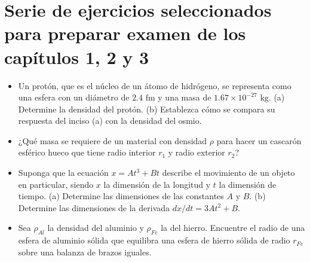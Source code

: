 \documentclass[11pt,a4paper]{article}
\begin{document}
\section*{Serie de ejercicios seleccionados para preparar examen de los capítulos 1, 2 y 3}

\begin{itemize}
    \item[\textbf{1.}] Un protón, que es el núcleo de un átomo de hidrógeno, se representa como una esfera con un diámetro de $2.4 \text{ fm}$ y una masa de $1.67 \times 10^{-27} \text{ kg}$. (a) Determine la densidad del protón. (b) Establezca cómo se compara su respuesta del inciso (a) con la densidad del osmio.
    \vspace*{6cm}

    \item[\textbf{2.}] ¿Qué masa se requiere de un material con densidad $\rho$ para hacer un cascarón esférico hueco que tiene radio interior $r_1$ y radio exterior $r_2$?
    \vspace*{5cm}

    \item[\textbf{3.}] Suponga que la ecuación $x = At^3 + Bt$ describe el movimiento de un objeto en particular, siendo $x$ la dimensión de la longitud y $t$ la dimensión de tiempo. (a) Determine las dimensiones de las constantes $A$ y $B$. (b) Determine las dimensiones de la derivada $dx/dt = 3At^2 + B$.
    \vspace*{6cm}

    \item[\textbf{4.}] Sea $\rho_{Al}$ la densidad del aluminio y $\rho_{Fe}$ la del hierro. Encuentre el radio de una esfera de aluminio sólida que equilibra una esfera de hierro sólida de radio $r_{Fe}$ sobre una balanza de brazos iguales.
    \vspace*{5cm}
\end{itemize}

\newpage
\end{document}
